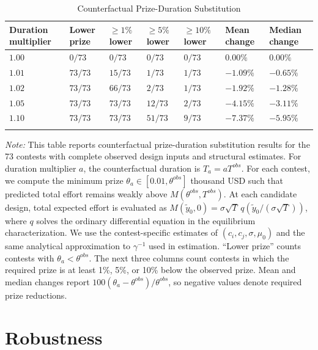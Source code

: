 \documentclass[mnsc]{informs3}
\begin{document}
\begin{table}[htbp]
\centering
\caption{Counterfactual Prize-Duration Substitution}
\label{tab-counterfactual-policy}
\scriptsize
\begin{tabularx}{\textwidth}{lYYYYYY}
\toprule
\textbf{Duration multiplier} & \textbf{Lower prize} & \textbf{$\geq1\%$ lower} & \textbf{$\geq5\%$ lower} & \textbf{$\geq10\%$ lower} & \textbf{Mean change} & \textbf{Median change} \\
\midrule
$1.00$ & $0/73$ & $0/73$ & $0/73$ & $0/73$ & $0.00\%$ & $0.00\%$ \\
$1.01$ & $73/73$ & $15/73$ & $1/73$ & $1/73$ & $-1.09\%$ & $-0.65\%$ \\
$1.02$ & $73/73$ & $66/73$ & $2/73$ & $1/73$ & $-1.92\%$ & $-1.28\%$ \\
$1.05$ & $73/73$ & $73/73$ & $12/73$ & $2/73$ & $-4.15\%$ & $-3.11\%$ \\
$1.10$ & $73/73$ & $73/73$ & $51/73$ & $9/73$ & $-7.37\%$ & $-5.95\%$ \\
\bottomrule
\addlinespace[0.5ex]
\end{tabularx}
\begin{minipage}{\textwidth}
{\footnotesize
\textit{Note:}
This table reports counterfactual prize-duration substitution results for the 73 contests with complete observed design inputs and structural estimates.
For duration multiplier $a$, the counterfactual duration is $T_a=aT^{obs}$.
For each contest, we compute the minimum prize $\theta_a\in[0.01,\theta^{obs}]$ thousand USD such that predicted total effort remains weakly above $M(\theta^{obs},T^{obs})$. At each candidate design, total expected effort is evaluated as $M(\tilde y_0,0)=\sigma\sqrt{T}\,q(\tilde y_0/(\sigma\sqrt{T}))$, where $q$ solves the ordinary differential equation in the equilibrium characterization. We use the contest-specific estimates of $(c_i,c_j,\sigma,\mu_0)$ and the same analytical approximation to $\gamma^{-1}$ used in estimation.
``Lower prize'' counts contests with $\theta_a<\theta^{obs}$.
The next three columns count contests in which the required prize is at least 1\%, 5\%, or 10\% below the observed prize.
Mean and median changes report $100(\theta_a-\theta^{obs})/\theta^{obs}$, so negative values denote required prize reductions.
}
\end{minipage}
\end{table}





\section{Robustness}
\end{document}
